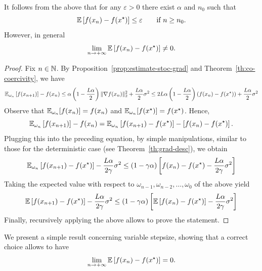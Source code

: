 \documentclass{report}
\begin{document}
\begin{remark}
	It follows from the above that for any $\varepsilon>0$ there exist $\alpha$ and $n_0$ such that 
	\begin{equation}
		\mathbb{E}\left[ f(x_n)-f(x^\star) \right] \le \varepsilon \qquad \text{if }n\ge n_0.
	\end{equation}
	However, in general 
	\begin{equation}
		\lim_{n\to +\infty} \mathbb{E}\left[ f(x_n)-f(x^\star) \right] \neq 0.
	\end{equation}
\end{remark}

\begin{proof}
	Fix $n\in\mathbb{N}$. 
	By Proposition~\ref{prop:estimate-stoc-grad} and Theorem~\ref{th:co-coercivity}, we have 
	\begin{equation}
		\mathbb{E}_{\omega_n}\left[ f(x_{n+1}) \right] -f(x_n)
		\le	\alpha\left( 1 - \frac{L\alpha}{2}\right)\|\nabla f(x_n)\|_2^2+\frac{L\alpha}{2}\sigma^2
		\le	2L\alpha\left( 1 - \frac{L\alpha}{2}\right)(f(x_n)-f(x^\star))+\frac{L\alpha}{2}\sigma^2
	\end{equation}
	Observe that $\mathbb{E}_{\omega_n}[f(x_n)]=f(x_n)$ and $\mathbb{E}_{\omega_n}[f(x^\star)]=f(x^\star)$. Hence, 
	\begin{equation}
		\mathbb{E}_{\omega_n}\left[ f(x_{n+1}) \right] -f(x_n) = \mathbb{E}_{\omega_n}\left[ f(x_{n+1}) -f(x^\star)\right] -\left[f(x_n) - f(x^\star) \right].
	\end{equation}
	Plugging this into the preceding equation, by simple manipulations, similar to those for the deterministic case (see Theorem~\ref{th:grad-desc}), we obtain
	\begin{equation}
		\mathbb{E}_{\omega_n}\left[ f(x_{n+1}) -f(x^\star)\right]	-\frac{L\alpha}{2\gamma} \sigma^2 \le (1-\gamma\alpha)\left[  f(x_{n}) -f(x^\star)	-\frac{L\alpha}{2\gamma} \sigma^2 \right]
	\end{equation}
	Taking the expected value with respect to $\omega_{n-1}, \omega_{n-2},\ldots, \omega_0$ of the above yield 
	\begin{equation}
		\label{eq:ciao}
		\mathbb{E}\left[ f(x_{n+1}) -f(x^\star)\right]	-\frac{L\alpha}{2\gamma} \sigma^2 \le (1-\gamma\alpha)\left[  \mathbb{E}\left[f(x_{n}) -f(x^\star)\right]	-\frac{L\alpha}{2\gamma} \sigma^2 \right]
	\end{equation}
	Finally, recursively applying the above allows to prove the statement.
\end{proof}

We present a simple result concerning variable stepsize, showing that a correct choice allows to have
\begin{equation}
	\lim_{n\to +\infty} \mathbb{E}\left[ f(x_n)-f(x^\star) \right] = 0.	
\end{equation}
\end{document}
